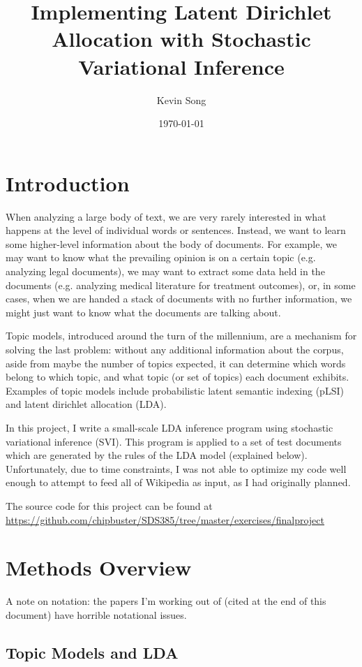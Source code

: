 \documentclass{article}
\author{Kevin Song}
\title{Implementing Latent Dirichlet Allocation with Stochastic Variational
  Inference}
\date{\today}
\begin{document}
\maketitle

\section{Introduction}

When analyzing a large body of text, we are very rarely interested in what
happens at the level of individual words or sentences. Instead, we want to
learn some higher-level information about the body of documents. For example, we
may want to know what the prevailing opinion is on a certain topic (e.g.
analyzing legal documents), we may want to extract some data held in the
documents (e.g. analyzing medical literature for treatment outcomes), or, in
some cases, when we are handed a stack of documents with no further information,
we might just want to know what the documents are talking about.

Topic models, introduced around the turn of the millennium, are a mechanism for
solving the last problem: without any additional information about the corpus,
aside from maybe the number of topics expected, it can determine which words
belong to which topic, and what topic (or set of topics) each document exhibits.
Examples of topic models include probabilistic latent semantic indexing (pLSI)
and latent dirichlet allocation (LDA).

In this project, I write a small-scale LDA inference program using stochastic
variational inference (SVI). This program is applied to a set of test documents which
are generated by the rules of the LDA model (explained below). Unfortunately,
due to time constraints, I was not able to optimize my code well enough to
attempt to feed all of Wikipedia as input, as I had originally planned.

The source code for this project can be found at \url{https://github.com/chipbuster/SDS385/tree/master/exercises/finalproject}

\section{Methods Overview}

A note on notation: the papers I'm working out of (cited at the end of this
document) have horrible notational issues.

\subsection{Topic Models and LDA}
\end{document}
